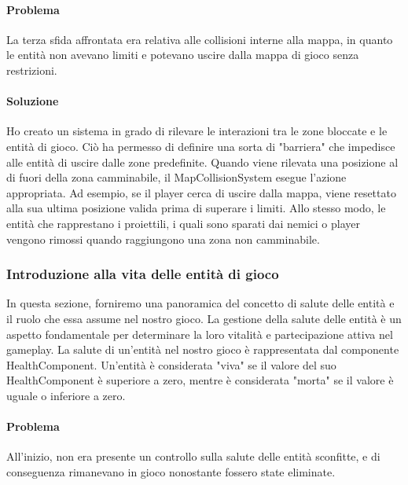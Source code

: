 \documentclass[a4paper,12pt]{report}
\begin{document}
\paragraph*{Problema}
La terza sfida affrontata era relativa alle collisioni interne alla mappa, in quanto le entità non avevano limiti e potevano uscire dalla mappa di gioco senza restrizioni.
\paragraph*{Soluzione}
Ho creato un sistema in grado di rilevare le interazioni tra le zone bloccate e le entità di gioco.
Ciò ha permesso di definire una sorta di "barriera" che impedisce alle entità di uscire dalle zone predefinite.
Quando viene rilevata una posizione al di fuori della zona camminabile, il MapCollisionSystem esegue l'azione appropriata.
Ad esempio, se il player cerca di uscire dalla mappa, viene resettato alla sua ultima posizione valida prima di superare i limiti.
Allo stesso modo, le entità che rapprestano i proiettili, i quali sono sparati dai nemici o player vengono rimossi quando raggiungono una zona non camminabile.
\subsubsection*{Introduzione alla vita delle entità di gioco}
In questa sezione, forniremo una panoramica del concetto di salute delle entità e il ruolo che essa assume nel nostro gioco. 
La gestione della salute delle entità è un aspetto fondamentale per determinare la loro vitalità e partecipazione attiva nel gameplay.
La salute di un'entità nel nostro gioco è rappresentata dal componente HealthComponent. 
Un'entità è considerata "viva" se il valore del suo HealthComponent è superiore a zero, mentre è considerata "morta" se il valore è uguale o inferiore a zero.
\paragraph*{Problema}
All'inizio, non era presente un controllo sulla salute delle entità sconfitte, e di conseguenza rimanevano in gioco nonostante fossero state eliminate.
\end{document}
